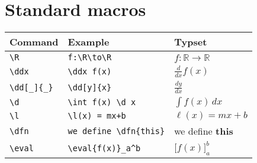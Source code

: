 \documentclass{article}
\newcommand{\R}{\mathbb R}
\renewcommand{\d}{\,d}
\newcommand{\dd}[2][]{\frac{d #1}{d #2}}
\renewcommand{\l}{\ell}
\newcommand{\ddx}{\frac{d}{dx}}
\newcommand{\dfn}{\textbf}
\newcommand{\eval}[1]{\bigg[ #1 \bigg]}
\begin{document}
\section*{Standard macros}

\renewcommand{\arraystretch}{2}
\begin{tabular*}{1.0\textwidth}{lll}
\hline
Command & Example & Typset \\
\hline
\verb|\R| & \verb|f:\R\to\R| & $f:\R\to\R$\\ 
\verb|\ddx| & \verb|\ddx f(x)| & $\ddx f(x)$\\
\verb|\dd[_]{_}| & \verb|\dd[y]{x}| & $\dd[y]{x}$ \\
\verb|\d | & \verb|\int f(x) \d x| & $\int f(x) \d x$\\
\verb|\l| & \verb|\l(x) = mx+b| & $\l(x) = mx +b$\\
\verb|\dfn| & \verb|we define \dfn{this}| & we define \dfn{this}\\
\verb|\eval| & \verb|\eval{f(x)}_a^b| & $\eval{f(x)}_a^b$
\end{tabular*}
\end{document}
